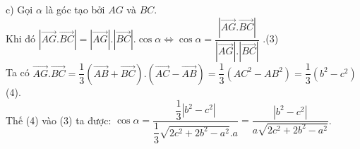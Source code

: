 \begin{bt}
{		c) Gọi $\alpha$ là góc tạo bởi $AG$ và $BC$. \\
		Khi đó $\left| \overrightarrow{AG}.\overrightarrow{BC} \right|=\left| \overrightarrow{AG} \right|.\left| \overrightarrow{BC} \right| .\cos \alpha \Leftrightarrow 
		\cos \alpha=\dfrac{\left| \overrightarrow{AG}.\overrightarrow{BC} \right|}{\left| \overrightarrow{AG} \right|.\left| \overrightarrow{BC} \right|}$ .(3)\\
		Ta có $\overrightarrow{AG}.\overrightarrow{BC}=\dfrac{1}{3}\left( \overrightarrow{AB}+\overrightarrow{BC} \right).\left( \overrightarrow{AC}-\overrightarrow{AB} \right)
		=\dfrac{1}{3}\left( AC^2-AB^2 \right)=\dfrac{1}{3}\left( b^2-c^2 \right)$ (4).\\
		Thế (4) vào (3) ta được: $\cos \alpha=\dfrac{\dfrac{1}{3}\left| b^2-c^2 \right|}{\dfrac{1}{3}\sqrt{2c^2+2b^2-a^2}.a}
		=\dfrac{\left| b^2-c^2 \right|}{a\sqrt{2c^2+2b^2-a^2}}$.
		
	} 
\end{bt}

